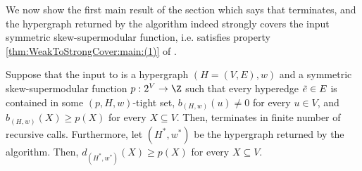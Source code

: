 We now show the first main result of the section which says that  terminates, and the hypergraph returned by the algorithm indeed strongly covers the input symmetric skew-supermodular function, i.e. satisfies property \ref{thm:WeakToStrongCover:main:(1)} of .

\begin{lemma}\label{lem:weak-to-strong:correctness:main:strong-cover}
    Suppose that the input to  is a  hypergraph $(H = (V, E), w)$ and a symmetric skew-supermodular function $p:2^V\rightarrow \Z$ %
such that every hyperedge $\Tilde{e} \in E$ is contained in some $(p, H, w)$-tight set, $b_{(H,w)}(u) \not = 0$ for every $u \in V$, and $b_{(H,w)}(X) \geq p(X)$ for every $X \subseteq V$.  Then,  terminates in finite number of recursive calls. Furthermore, let $(H^*, w^*)$ be the hypergraph returned by the algorithm. Then, $d_{(H^*, w^*)}(X) \geq p(X)$ for every $X\subseteq V$.
\end{lemma}
